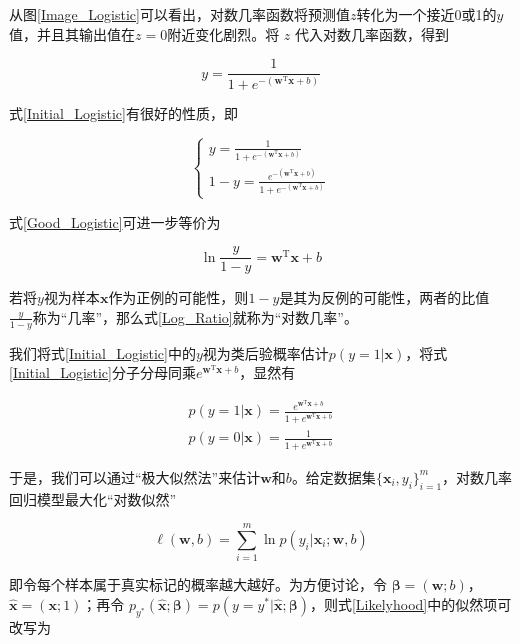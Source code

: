\documentclass{ctexart}
\begin{document}
	从图\ref{Image_Logistic}可以看出，对数几率函数将预测值$z$转化为一个接近0或1的$y$值，并且其输出值在$z=0$附近变化剧烈。将 $z$ 代入对数几率函数，得到
	
	\begin{equation}
		y=\frac{1}{1+e^{-(\bm{w}^\mathrm{T}\bm{x}+b)}}
		\label{Initial_Logistic}
	\end{equation}

	式\eqref{Initial_Logistic}有很好的性质，即
	
	\begin{equation}
		\left\{\begin{matrix}
		y=\frac{1}{1+e^{-(\bm{w}^\mathrm{T}\bm{x}+b)}}	\\
		1-y=\frac{e^{-(\bm{w}^\mathrm{T}\bm{x}+b)}}{1+e^{-(\bm{w}^\mathrm{T}\bm{x}+b)}}
		\end{matrix}\right.
		\label{Good_Logistic}
	\end{equation}
	
	式\eqref{Good_Logistic}可进一步等价为
	
	\begin{equation}
		\ln\frac{y}{1-y}=\bm{w}^\mathrm{T}\bm{x}+b
		\label{Log_Ratio}
	\end{equation}

	若将$y$视为样本$\bm{x}$作为正例的可能性，则$1-y$是其为反例的可能性，两者的比值$\frac{y}{1-y}$称为“几率”，那么式\eqref{Log_Ratio}就称为“对数几率”。
	
	我们将式\eqref{Initial_Logistic}中的$y$视为类后验概率估计$p(y=1|\bm{x})$，将式\eqref{Initial_Logistic}分子分母同乘$e^{\bm{w}^\mathrm{T}\bm{x}+b}$，显然有
	
	\begin{equation}
		\begin{aligned}
			p(y=1|\bm{x})=\frac{e^{\bm{w}^\mathrm{T}\bm{x}+b}}{1+e^{\bm{w}^\mathrm{T}\bm{x}+b}}\\
			p(y=0|\bm{x})=\frac{1}{1+e^{\bm{w}^\mathrm{T}\bm{x}+b}}
		\end{aligned}
	\end{equation}

	于是，我们可以通过“极大似然法”来估计$\bm{w}$和$b$。给定数据集$\{\bm{x}_i,y_i\}_{i=1}^m$，对数几率回归模型最大化“对数似然”
	
	\begin{equation}
		\ell(\bm{w},b)=\sum_{i=1}^m\ln p(y_i|\bm{x}_i;\bm{w},b)
		\label{Likelyhood}
	\end{equation}

	即令每个样本属于真实标记的概率越大越好。为方便讨论，令 $\bm{\beta}=(\bm{w};b)$，$\hat{\bm{x}}=(\bm{x};1)$；再令 $p_{y^\ast}(\hat{\bm{x}};\bm{\beta})=p(y=y^\ast|\hat{\bm{x}};\bm{\beta})$，则式\eqref{Likelyhood}中的似然项可改写为
	
\end{document}

